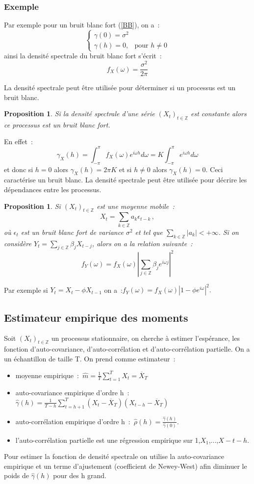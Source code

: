 \documentclass[11pt]{scrartcl} %
\newtheorem{pro}[theorem]{Proposition}
\newcommand{\Xt}{\left(X_t\right)_{t\in\mathbb{Z}}}
\begin{document}
\subsubsection*{Exemple}
Par exemple pour un bruit blanc fort (\ref{BB}), on a~:
$$
\left\{
\begin{array}{cc}
\gamma(0)=\sigma^2&\\
\gamma(h)= 0,& \textrm{pour $h\not=0$} 
\end{array}
\right.
$$
ainsi la densité spectrale du bruit blanc fort s'écrit~:
$$
f_X(\omega) = \frac{\sigma^2}{2\pi}
$$





La densité spectrale peut être utilisée pour déterminer si un processus est un bruit blanc.
\begin{pro}
Si la densité spectrale d'une série $\Xt$ est constante alors ce processus est un bruit blanc fort.
\end{pro}
En effet~:
$$
\gamma_X(h)=\int_{-\pi}^{\pi}f_X(\omega)e^{i\omega h}d\omega = K\int_{-\pi}^{\pi}e^{i\omega h}d\omega
$$
et donc si $h=0$ alors $\gamma_X(h)=2\pi K$ et si $h\not=0$ alors $\gamma_X(h)=0$. Ceci caractérise un bruit blanc. La densité spectrale peut être utilisée pour décrire les dépendances entre les processus.
\begin{pro}
Si $\Xt$ est une moyenne mobile~:
$$
X_t = \sum_{k\in\mathbb{Z}}a_k\epsilon_{t-k}\,,
$$
où $\epsilon_t$ est un bruit blanc fort de variance $\sigma^2$ et tel que $\sum_{k\in\mathbb{Z}}|a_k| <+\infty$. Si on considère $Y_t = \sum_{j\in\mathbb{Z}}\beta_jX_{t-j}$, alors on a la relation suivante~:
$$
f_Y(\omega)=f_X(\omega)\left|\sum_{j\in\mathbb{Z}}\beta_je^{i\omega j}\right|^2
$$
\end{pro}
Par exemple si $Y_t=X_t-\phi X_{t-1}$ on a~:$f_Y(\omega)=f_X(\omega)\left|1-\phi e^{i\omega}\right|^2.$
\subsection{Estimateur empirique des moments}
Soit $(X_t)_{t\in\mathbb{Z}}$ un processus stationnaire, on cherche à estimer l'espérance, les fonction d'auto-covariance, d'auto-corrélation et d'auto-corrélation partielle. On a un échantillon de taille T. On prend comme estimateur~:
\begin{itemize}
\item moyenne empirique~:~$\hat{m}=\frac{1}{T}\sum_{t=1}^TX_t=\overline{X}_T$\\
\item auto-covariance empirique d'ordre h~:~$\hat{\gamma}(h)=\frac{1}{T-h}\sum_{t=h+1}^T(X_t-\overline{X}_T)(X_{t-h}-\overline{X}_T)$\\
\item auto-corrélation empirique d'ordre h~:~$\hat{\rho}(h)=\frac{\hat{\gamma}(h)}{\hat{\gamma}(0)}$.\\
\item l'auto-corrélation partielle est une régression empirique sur 1,$X_1$,...,$X-{t-h}$.
\end{itemize}
Pour estimer la fonction de densité spectrale on utilise la auto-covariance empirique et un terme d'ajustement (coefficient de Newey-West) afin diminuer le poids de $\hat{\gamma}(h)$ pour des h grand.
\end{document}
